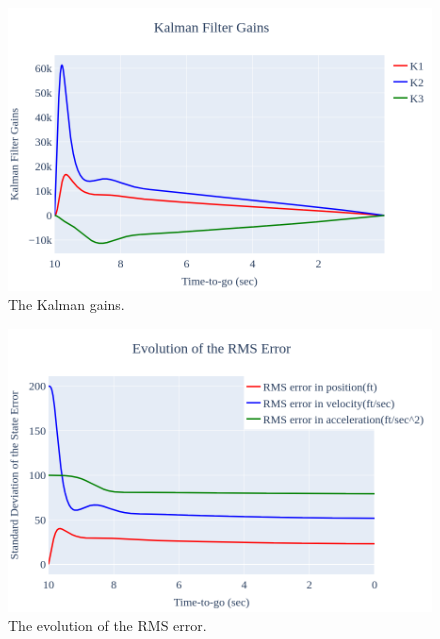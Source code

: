 \documentclass{article}
\begin{document}
\begin{figure}
    \centering
    \includegraphics[width=1\textwidth]{figk.png}
    \caption{The Kalman gains.}
    \label{Kalman_gains}
\end{figure}

\begin{figure}
    \centering
    \includegraphics[width=1\textwidth]{figp.png}
    \caption{The evolution of the RMS error.}
    \label{covariance_a_priori}
\end{figure}
\end{document}
